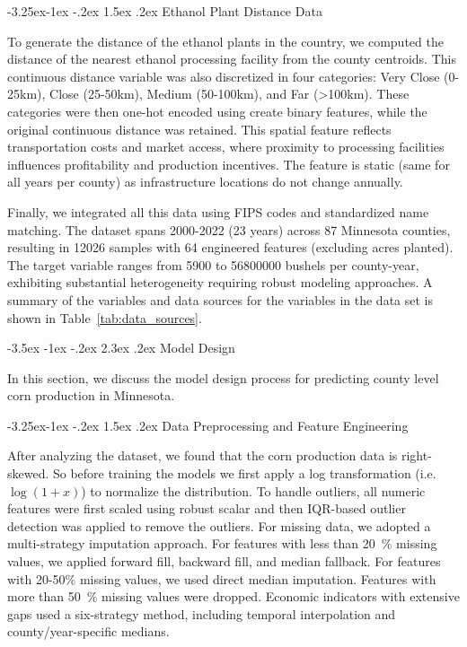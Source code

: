 \documentclass[10pt,twocolumn]{article}
\makeatletter
\newcommand{\reftab}[1]{Table~\ref{#1}}
\renewcommand\section{\@startsection{section}{1}{\z@}%
  {-3.5ex \@plus -1ex \@minus -.2ex}%
  {2.3ex \@plus.2ex}%
  {\normalfont\large\bfseries}}
\renewcommand\subsection{\@startsection{subsection}{2}{\z@}%
  {-3.25ex\@plus -1ex \@minus -.2ex}%
  {1.5ex \@plus .2ex}%
  {\normalfont\normalsize\bfseries}}
\makeatother
\begin{document}
\subsection{Ethanol Plant Distance Data}

To generate the distance of the ethanol plants in the country, we computed the distance of the nearest ethanol processing facility from the county centroids.
This continuous distance variable was also discretized in four categories: Very Close (0-25km), Close (25-50km), Medium (50-100km), and Far (>100km).
These categories were then one-hot encoded using create binary features, while the original continuous distance was retained.
This spatial feature reflects transportation costs and market access, where proximity to processing facilities influences profitability and production incentives.
The feature is static (same for all years per county) as infrastructure locations do not change annually.

Finally, we integrated all this data using FIPS codes and standardized name matching.
The dataset spans 2000-2022 (23 years) across 87 Minnesota counties, resulting in \num{12026} samples with 64 engineered features (excluding acres planted).
The target variable ranges from \num{5900} to \num{56800000} bushels per county-year, exhibiting substantial heterogeneity requiring robust modeling approaches.
A summary of the variables and data sources for the variables in the data set is shown in \reftab{tab:data_sources}.

\section{Model Design}
\label{sec:preprocessing}

In this section, we discuss the model design process for predicting county level corn production in Minnesota.

\subsection{Data Preprocessing and Feature Engineering}

After analyzing the dataset, we found that the corn production data is right-skewed.
So before training the models we first apply a log transformation (i.e. \(\log(1+x)\)) to normalize the distribution.
To handle outliers, all numeric features were first scaled using robust scalar and then IQR-based outlier detection was applied to remove the outliers.
For missing data, we adopted a multi-strategy imputation approach.
For features with less than \SI{20}{\percent} missing values, we applied forward fill, backward fill, and median fallback.
For features with 20-50\% missing values, we used direct median imputation.
Features with more than \SI{50}{\percent} missing values were dropped.
Economic indicators with extensive gaps used a six-strategy method, including temporal interpolation and county/year-specific medians.
\end{document}
